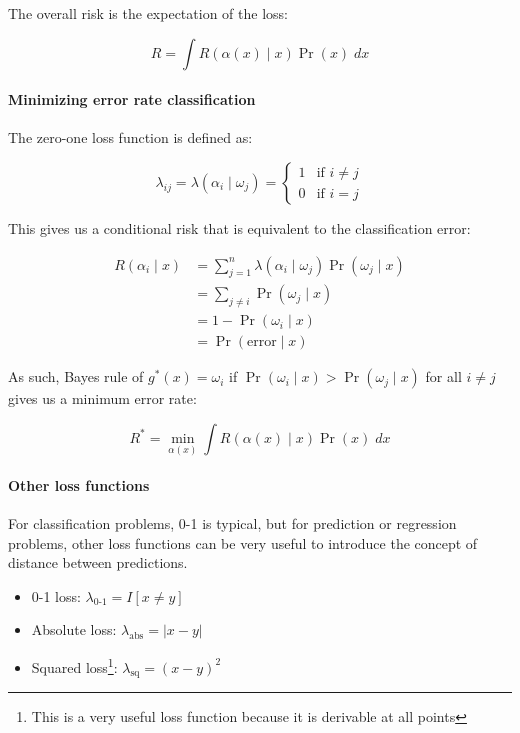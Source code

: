 \documentclass{idc_msc}
\begin{document}
The overall risk is the expectation of the loss:

\[R = \int R(\alpha(x) \mid x) \Pr(x) \; dx\]

\paragraph{Minimizing error rate classification}

The zero-one loss function is defined as:

\[
  \lambda_{ij} = \lambda(\alpha_i \mid \omega_j) = \begin{cases}
  1 & \text{if \(i \ne j\)} \\
  0 & \text{if \(i = j\)}
  \end{cases}
\]

This gives us a conditional risk that is equivalent to the classification error:

\[
\begin{aligned}
R(\alpha_i \mid x)
&= \sum_{j=1}^n \lambda(\alpha_i \mid \omega_j)\Pr(\omega_j \mid x) \\
&= \sum_{j \ne i} \Pr(\omega_j \mid x) \\
&= 1 - \Pr(\omega_i \mid x) \\
&= \Pr(\text{error} \mid x)
\end{aligned}
\]

As such, Bayes rule of \(g^*(x) = \omega_i\) if \(\Pr(\omega_i \mid x) > \Pr(\omega_j \mid x)\) for all \(i \ne j\) gives us a minimum error rate:

\[R^* = \min_{\alpha(x)} \int R(\alpha(x) \mid x)\Pr(x) \; dx\]

\paragraph{Other loss functions}

For classification problems, 0-1 is typical, but for prediction or regression problems, other loss functions can be very useful to introduce the concept of distance between predictions.

\begin{itemize}
  \item 0-1 loss: \(\lambda_{\text{0-1}}=I[x \ne y]\)
  \item Absolute loss: \(\lambda_{\text{abs}} = |x - y|\)
  \item Squared loss\footnote{This is a very useful loss function because it is derivable at all points}: \(\lambda_{\text{sq}} = (x - y)^2\)
\end{itemize}
\end{document}
